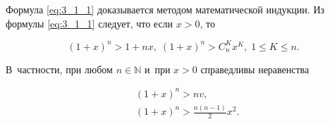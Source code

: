 \begin{enumerate}
\noindent
Формула \eqref{eq:3_1_1} доказывается методом математической индукции.
Из формулы \eqref{eq:3_1_1} следует, что если $x > 0$, то

\begin{equation*}
(1 + x)^{n} > 1 + nx, \;
(1 + x)^{n} > C_{n}^{K}x^{K}, \;
1 \leqslant K \leqslant n.
\end{equation*}

\noindent
В~частности, при любом $n \in \mathbb{N}$ и~при $x > 0$ справедливы неравенства

\begin{align}
& (1 + x)^{n} > nv, \\
& \displaystyle  (1 + x)^{n} > \frac{n(n-1)}{2}x^{2}.
\end{align}
\end{enumerate}

